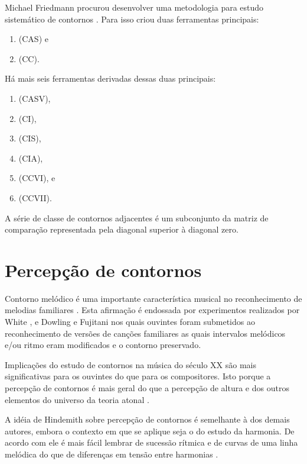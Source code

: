 Michael Friedmann procurou desenvolver uma metodologia para estudo
sistemático de contornos \cite{friedmann85:methodology}. Para isso
criou duas ferramentas principais:

\begin{enumerate}
\item {} (CAS) e
\item {} (CC).
\end{enumerate}

Há mais seis ferramentas derivadas dessas duas principais:

\begin{enumerate}
\item {} (CASV),
\item {} (CI),
\item {} (CIS),
\item {} (CIA),
\item {} (CCVI), e
\item {} (CCVII).
\end{enumerate}

A série de classe de contornos adjacentes é um subconjunto da matriz
de comparação representada pela diagonal superior à diagonal zero.

\section{Percepção de contornos}
\label{sec:perc-de-cont}

Contorno melódico é uma importante característica musical no
reconhecimento de melodias familiares
\cite[p. 136]{dowling.ea86:music}. Esta afirmação é endossada por
experimentos realizados por White \cite{white60:recognition}, e
Dowling e Fujitani \cite{dowling.ea71:contour} nos quais ouvintes
foram submetidos ao reconhecimento de versões de canções familiares as
quais intervalos melódicos e/ou ritmo eram modificados e o contorno
preservado.

Implicações do estudo de contornos na música do século XX são mais
significativas para os ouvintes do que para os compositores. Isto
porque a percepção de contornos é mais geral do que a percepção de
altura e dos outros elementos do universo da teoria atonal
\cite[p. 224]{friedmann85:methodology}.

A idéia de Hindemith sobre percepção de contornos é semelhante à dos
demais autores, embora o contexto em que se aplique seja o do estudo
da harmonia. De acordo com ele é mais fácil lembrar de sucessão
rítmica e de curvas de uma linha melódica do que de diferenças em
tensão entre harmonias \cite[p. 175]{hindemith41:craft}.

